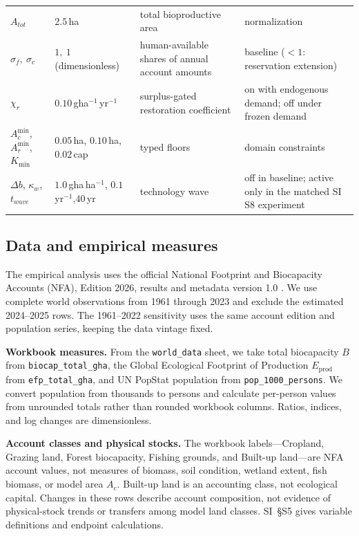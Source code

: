 \documentclass[preprint,12pt,authoryear]{elsarticle}
\newcommand{\Acmin}{A_c^{\min}}
\begin{document}
\begin{table}[!htbp]
\begin{tabularx}{\textwidth}{@{}>{\raggedright\arraybackslash}p{} >{\raggedright\arraybackslash}p{} >{\raggedright\arraybackslash}X >{\raggedright\arraybackslash}p{}@{}}
$A_{tot}$ & $2.5$\,ha & total bioproductive area & normalization \\
$\sigma_f,\ \sigma_c$ & $1,\ 1$ (dimensionless) & human-available shares of annual account amounts & baseline ($<1$: reservation extension) \\
$\chi_r$ & $0.10$\,gha$^{-1}$\,yr$^{-1}$ & surplus-gated restoration coefficient & on with endogenous demand; off under frozen demand \\
$\Acmin$, $A_r^{\min}$,\newline $K_{\min}$ & $0.05$\,ha, $0.10$\,ha,\newline $0.02$\,cap & typed floors & domain constraints \\
$\Delta b$, $\kappa_w$,\newline $t_{wave}$ & $1.0$\,gha\,ha$^{-1}$, $0.1$\,yr$^{-1}$,\newline $40$\,yr & technology wave & off in baseline; active only in the matched SI S8 experiment \\
\bottomrule
\end{tabularx}
\end{table}

\subsection{Data and empirical measures}\label{sec:data}

The empirical analysis uses the official National Footprint and Biocapacity Accounts (NFA), Edition 2026, results and metadata version 1.0 \citep{Lo2026NFA}. We use complete world observations from 1961 through 2023 and exclude the estimated 2024--2025 rows. The 1961--2022 sensitivity uses the same account edition and population series, keeping the data vintage fixed.

\textbf{Workbook measures.} From the \texttt{world\_data} sheet, we take total biocapacity $B$ from \texttt{biocap\_total\_gha}, the Global Ecological Footprint of Production $E_{\mathrm{prod}}$ from \texttt{efp\_total\_gha}, and UN PopStat population from \texttt{pop\_1000\_persons}. We convert population from thousands to persons and calculate per-person values from unrounded totals rather than rounded workbook columns. Ratios, indices, and log changes are dimensionless.

\textbf{Account classes and physical stocks.} The workbook labels---Cropland, Grazing land, Forest biocapacity, Fishing grounds, and Built-up land---are NFA account values, not measures of biomass, soil condition, wetland extent, fish biomass, or model area $A_c$. Built-up land is an accounting class, not ecological capital. Changes in these rows describe account composition, not evidence of physical-stock trends or transfers among model land classes. SI~\S S5 gives variable definitions and endpoint calculations.
\end{document}

